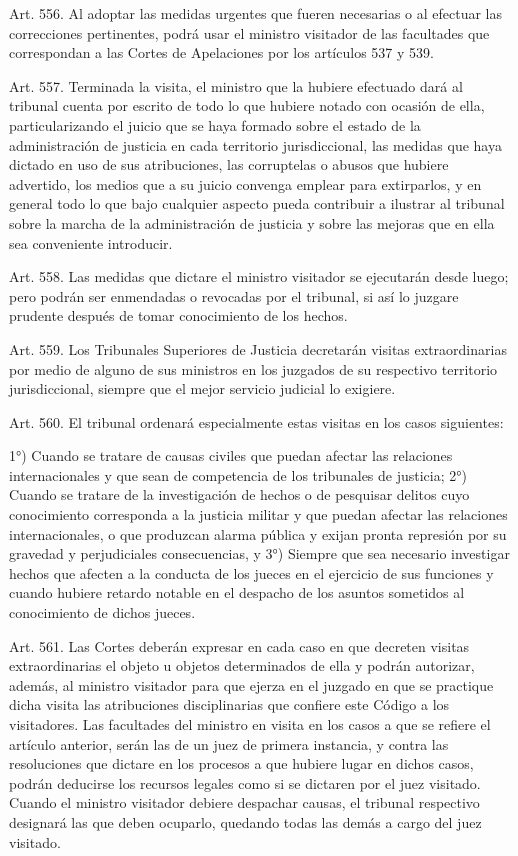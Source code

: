     Art. 556. Al adoptar las medidas urgentes que fueren necesarias o al efectuar las correcciones pertinentes, podrá usar el ministro visitador de las facultades que correspondan a las Cortes de Apelaciones por los artículos 537 y 539.


    Art. 557. Terminada la visita, el ministro que la hubiere efectuado dará al tribunal cuenta por escrito de todo lo que hubiere notado con ocasión de ella, particularizando el juicio que se haya formado sobre el estado de la administración de justicia en cada territorio jurisdiccional, las medidas que haya dictado en uso de sus atribuciones, las corruptelas o abusos que hubiere advertido, los medios que a su juicio convenga emplear para extirparlos, y en general todo lo que bajo cualquier aspecto pueda contribuir a ilustrar al tribunal sobre la marcha de la administración de justicia y sobre las mejoras que en ella sea conveniente introducir.


    Art. 558. Las medidas que dictare el ministro visitador se ejecutarán desde luego; pero podrán ser enmendadas o revocadas por el tribunal, si así lo juzgare prudente después de tomar conocimiento de los hechos.


    Art. 559. Los Tribunales Superiores de Justicia decretarán visitas extraordinarias por medio de alguno de sus ministros en los juzgados de su respectivo territorio jurisdiccional, siempre que el mejor servicio judicial lo exigiere.


    Art. 560. El tribunal ordenará especialmente estas visitas en los casos siguientes:

    1°) Cuando se tratare de causas civiles que puedan afectar las relaciones internacionales y que sean de competencia de los tribunales de justicia;
    2°) Cuando se tratare de la investigación de hechos o de pesquisar delitos cuyo conocimiento corresponda a la justicia militar y que puedan afectar las relaciones internacionales, o que produzcan alarma pública y exijan pronta represión por su gravedad y perjudiciales consecuencias, y
    3°) Siempre que sea necesario investigar hechos que afecten a la conducta de los jueces en el ejercicio de sus funciones y cuando hubiere retardo notable en el despacho de los asuntos sometidos al conocimiento de dichos jueces.



    Art. 561. Las Cortes deberán expresar en cada caso en que decreten visitas extraordinarias el objeto u objetos determinados de ella y podrán autorizar, además, al ministro visitador para que ejerza en el juzgado en que se practique dicha visita las atribuciones disciplinarias que confiere este Código a los visitadores.
    Las facultades del ministro en visita en los casos a que se refiere el artículo anterior, serán las de un juez de primera instancia, y contra las resoluciones que dictare en los procesos a que hubiere lugar en dichos casos, podrán deducirse los recursos legales como si se dictaren por el juez visitado.
    Cuando el ministro visitador debiere despachar causas, el tribunal respectivo designará las que deben ocuparlo, quedando todas las demás a cargo del juez visitado.



